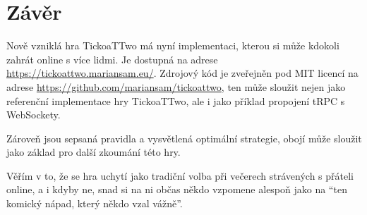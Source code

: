 \chapter*{Závěr}

Nově vzniklá hra TickoaTTwo má nyní implementaci, kterou si může kdokoli zahrát
online s více lidmi. Je dostupná na adrese \url{https://tickoattwo.mariansam.eu/}.
Zdrojový kód je zveřejněn pod MIT licencí na adrese
\url{https://github.com/mariansam/tickoattwo}, ten může sloužit nejen jako
referenční implementace hry TickoaTTwo, ale i jako příklad propojení tRPC s
WebSockety.

Zároveň jsou sepsaná pravidla a vysvětlená optimální strategie, obojí může
sloužit jako základ pro další zkoumání této hry.

Věřím v to, že se hra uchytí jako tradiční volba při večerech strávených s
přáteli online, a i kdyby ne, snad si na ni občas někdo vzpomene alespoň jako
na \enquote{ten komický nápad, který někdo vzal vážně}.
